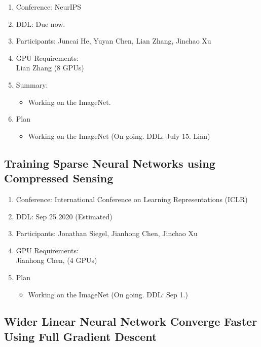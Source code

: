 \begin{enumerate}
	\item Conference: NeurIPS
	\item DDL: Due now.
	\item Participants: Juncai He, Yuyan Chen, Lian Zhang, Jinchao Xu
	\item GPU Requirements: \\
	Lian Zhang (8 GPUs)\\
	\item Summary: 
	\begin{itemize}
		\item Working on the ImageNet.
	\end{itemize}
	\item Plan
	\begin{itemize}
	\item Working on the ImageNet (On going. DDL: July 15. Lian)
	\end{itemize}
\end{enumerate}

\subsection{Training Sparse Neural Networks using Compressed Sensing}

\begin{enumerate}
\item Conference: International Conference on Learning Representations (ICLR)
\item DDL: Sep 25 2020 (Estimated)
	\item Participants: Jonathan Siegel, Jianhong Chen, Jinchao Xu
	\item GPU Requirements: \\
	Jianhong Chen, (4 GPUs)\\
		\item Plan
	\begin{itemize}
		\item Working on the ImageNet (On going. DDL: Sep 1.)
	\end{itemize}
\end{enumerate}


\subsection{Wider Linear Neural Network Converge Faster Using Full Gradient Descent}

